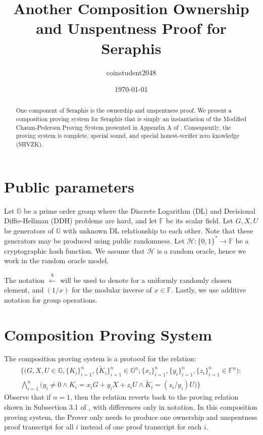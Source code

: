 \documentclass{article}
\title{Another Composition Ownership and Unspentness Proof for Seraphis}
\author{coinstudent2048}
\date{\today}
\begin{document}
\maketitle

\begin{abstract}
One component of Seraphis \cite{seraphis, seraphis2} is the ownership and unspentness proof. We present a composition proving system for Seraphis that is simply an instantiation of the Modified Chaum-Pedersen Proving System presented in Appendix A of \cite{lelantus-spark}. Consequently, the proving system is complete, special sound, and special honest-verifier zero knowledge (SHVZK).
\end{abstract}

\section{Public parameters}
Let $\mathbb{G}$ be a prime order group where the Discrete Logarithm (DL) and Decisional Diffie-Hellman (DDH) problems are hard, and let $\mathbb{F}$ be its scalar field. Let $G, X, U$ be generators of $\mathbb{G}$ with unknown DL relationship to each other. Note that these generators may be produced using public randomness. Let $\mathcal{H}:\{0,1\}^*\rightarrow\mathbb{F}$ be a cryptographic hash function. We assume that $\mathcal{H}$ is a random oracle, hence we work in the random oracle model.

The notation $\xleftarrow{\$}$ will be used to denote for a uniformly randomly chosen element, and $(1/x)$ for the modular inverse of $x\in\mathbb{F}$. Lastly, we use additive notation for group operations.


\section{Composition Proving System}
The composition proving system is a protocol for the relation:
\begin{multline*}
\Big\{\big(G, X, U\in\mathbb{G}, \{K_i\}_{i=1}^n, \{\tilde{K}_i\}_{i=1}^n \in\mathbb{G}^n; \{x_i\}_{i=1}^n, \{y_i\}_{i=1}^n, \{z_i\}_{i=1}^n \in\mathbb{F}^n\big): \\ \bigwedge_{i=1}^n{\big(y_i \ne 0 \wedge K_i = x_i G + y_i X + z_i U \wedge \tilde{K}_i = (z_i/y_i)U\big)} \Big\}
\end{multline*}
Observe that if $n = 1$, then the relation reverts back to the proving relation shown in Subsection 3.1 of \cite{seraphis2}, with differences only in notation. In this composition proving system, the Prover only needs to produce one ownership and unspentness proof transcript for all $i$ instead of one proof transcript for each $i$.
\end{document}
